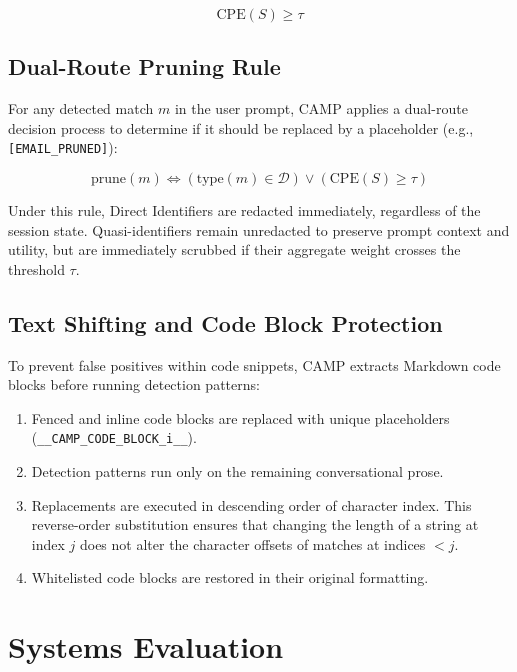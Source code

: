 \documentclass[conference]{IEEEtran}
\begin{document}
\begin{equation}
\mathrm{CPE}(S) \geq \tau
\end{equation}

\subsection{Dual-Route Pruning Rule}
For any detected match $m$ in the user prompt, CAMP applies a dual-route decision process to determine if it should be replaced by a placeholder (e.g., \texttt{[EMAIL\_PRUNED]}):

\begin{equation}
\text{prune}(m) \iff (\text{type}(m) \in \mathcal{D}) \lor (\mathrm{CPE}(S) \geq \tau)
\end{equation}

Under this rule, Direct Identifiers are redacted immediately, regardless of the session state. Quasi-identifiers remain unredacted to preserve prompt context and utility, but are immediately scrubbed if their aggregate weight crosses the threshold $\tau$.

\subsection{Text Shifting and Code Block Protection}
To prevent false positives within code snippets, CAMP extracts Markdown code blocks before running detection patterns:
\begin{enumerate}
    \item Fenced and inline code blocks are replaced with unique placeholders (\texttt{\_\_CAMP\_CODE\_BLOCK\_i\_\_}).
    \item Detection patterns run only on the remaining conversational prose.
    \item Replacements are executed in descending order of character index. This reverse-order substitution ensures that changing the length of a string at index $j$ does not alter the character offsets of matches at indices $< j$.
    \item Whitelisted code blocks are restored in their original formatting.
\end{enumerate}

\section{Systems Evaluation}
\end{document}
